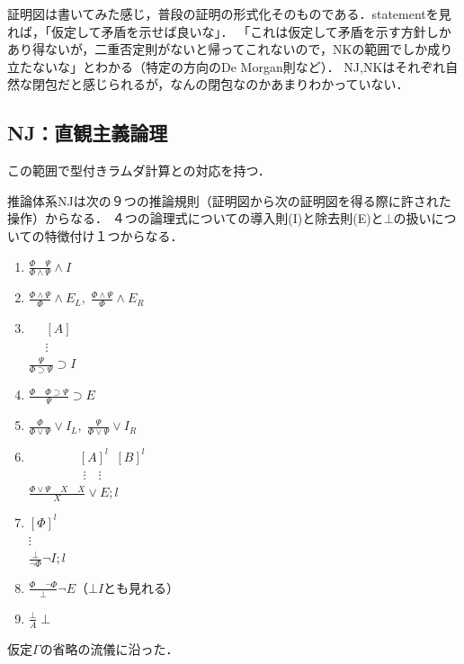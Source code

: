 \documentclass[uplatex, dvipdfmx]{jsreport}
\begin{document}
\begin{screen}
    証明図は書いてみた感じ，普段の証明の形式化そのものである．statementを見れば，「仮定して矛盾を示せば良いな」．
    「これは仮定して矛盾を示す方針しかあり得ないが，二重否定則がないと帰ってこれないので，NKの範囲でしか成り立たないな」とわかる（特定の方向のDe Morgan則など）．
    NJ,NKはそれぞれ自然な閉包だと感じられるが，なんの閉包なのかあまりわかっていない．
\end{screen}

\subsection{NJ：直観主義論理}
この範囲で型付きラムダ計算との対応を持つ．

\begin{definition}[NJ]
    推論体系NJは次の９つの推論規則（証明図から次の証明図を得る際に許された操作）からなる．
    ４つの論理式についての導入則(I)と除去則(E)と$\bot$の扱いについての特徴付け１つからなる．
    \begin{enumerate}
        \item $\frac{\Phi\;\;\;\;\Psi}{\Phi\land\Psi}\land I$
        \item $\frac{\Phi\land\Psi}{\Phi}\land E_L,\;\frac{\Phi\land\Psi}{\Phi}\land E_R$
        \item 　 $[A]$\\
        　 $\vdots$\\
        $\frac{\Psi}{\Phi\supset\Psi}\supset I$
        \item $\frac{\Phi\;\;\;\;\Phi\supset\Psi}{\Psi}\supset E$
        \item $\frac{\Phi}{\Phi\lor\Psi}\lor I_L,\;\frac{\Psi}{\Phi\lor\Psi}\lor I_R$
        \item  　　　　$[A]^l\;\;[B]^l$\\
        　 　　　$\vdots$　$\vdots$\\
        $\frac{\Phi\lor\Psi\;\;\;\;X\;\;\;\;X}{X}\lor E;l$
        \item  $[\Phi]^l$\\
        $\vdots$\\
        $\frac{\bot}{\lnot\Phi}\lnot I;l$
        \item $\frac{\Phi\;\;\;\;\lnot\Phi}{\bot}\lnot E$（$\bot I$とも見れる）
        \item $\frac{\bot}{A}\;\bot$
    \end{enumerate}
    仮定$\Gamma$の省略の流儀に沿った．
\end{definition}
\end{document}
